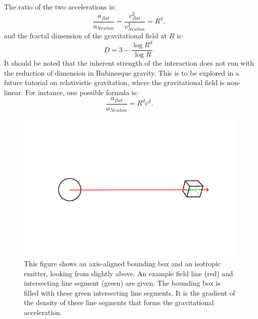 \documentclass[12pt]{article}
\begin{document}
The ratio of the two accelerations is:
\begin{equation}
\frac{a_{\textit{flat}}}{a_{\textit{Newton}}} = \frac{v_{\textit{flat}}^2}{v_{\textit{Newton}}^2} = R^{d}, 
\end{equation}
and the fractal dimension of the gravitational field at $R$ is:
\begin{equation}
D = 3 - \frac{\log R^d}{\log R}. %
\end{equation}
It should be noted that the inherent strength of the interaction does not run with the reduction of dimension in Rubinesque gravity.
This is to be explored in a future tutorial on relativistic gravitation, where the gravitational field is non-linear.
For instance, one possible formula is:
\begin{equation}
\frac{a_{\textit{flat}}}{a_{\textit{Newton}}} = R^{d} c^{d}.
\end{equation}





\begin{figure} 
\centering
\label{fig1}
  \includegraphics[width = 7 in]{AABB.png}
  \caption{
This figure shows an axis-aligned bounding box and an isotropic emitter, looking from slightly above.
An example field line (red) and intersecting line segment (green) are given.
The bounding box is filled with these green intersecting line segments.
It is the gradient of the density of these line segments that forms the gravitational acceleration.
}
\end{figure}
\end{document}

